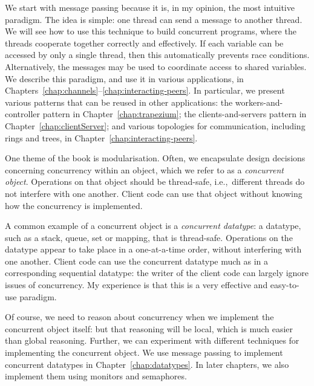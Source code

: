 We start with message passing because it is, in my
opinion, the most intuitive paradigm.  The idea is simple: one thread can send
a message to another thread.  We will see how to use this technique to build
concurrent programs, where the threads cooperate together correctly and
effectively.  If each variable can be accessed by only a single thread, then
this automatically prevents race conditions.  Alternatively, the messages may
be used to coordinate access to shared variables.  We describe this paradigm,
and use it in various applications, in
Chapters~\ref{chap:channels}--\ref{chap:interacting-peers}.  In particular, we
present various patterns that can be reused in other applications: the
workers-and-controller pattern in Chapter~\ref{chap:trapezium}; the
clients-and-servers pattern in Chapter~\ref{chap:clientServer}; and various
topologies for communication, including rings and trees, in
Chapter~\ref{chap:interacting-peers}. 

One theme of the book is modularisation.  Often, we
encapsulate design decisions concerning concurrency within an object, which we
refer to as a \emph{concurrent object}.  Operations on that object should be
thread-safe, i.e.,~different threads do not interfere with one another.
Client code can use that object without knowing how the concurrency is
implemented.

A common example of a concurrent object is a \emph{concurrent
  datatype}: a datatype, such as a stack, queue,
set or mapping, that is thread-safe.  Operations on the datatype appear to
take place in a one-at-a-time order, without interfering with one another.
Client code can use the concurrent datatype much as in a corresponding
sequential datatype: the writer of the client code can largely ignore issues
of concurrency.  My experience is that this is a very effective and
easy-to-use paradigm.

Of course, we  need to reason about concurrency when we implement the
concurrent object itself: but that reasoning will be local, which is much
easier than global reasoning.  Further, we can experiment with different
techniques for implementing the concurrent object.  We use message passing to
implement concurrent datatypes in Chapter~\ref{chap:datatypes}.  In later
chapters, we also implement them using monitors and semaphores.



